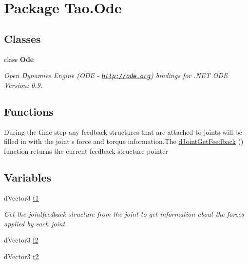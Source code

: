 \hypertarget{namespace_tao_1_1_ode}{
\section{Package Tao.Ode}
\label{namespace_tao_1_1_ode}
}
\subsection*{Classes}
\begin{DoxyCompactItemize}
\item 
class {\bfseries Ode}
\begin{DoxyCompactList}\small\item\em Open Dynamics Engine (ODE -\/ \href{http://ode.org}{\tt http://ode.org}) bindings for .NET ODE Version: 0.9. \item\end{DoxyCompactList}\end{DoxyCompactItemize}
\subsection*{Functions}
\begin{DoxyCompactItemize}
\item 
During the time step any feedback structures that are attached to joints will be filled in with the joint s force and torque information.The \hyperlink{namespace_tao_1_1_ode_acb665b0ad53713bdc6095725a790aa80}{dJointGetFeedback} () function returns the current feedback structure pointer
\end{DoxyCompactItemize}
\subsection*{Variables}
\begin{DoxyCompactItemize}
\item 
dVector3 \hyperlink{namespace_tao_1_1_ode_a18b074b8eb179ae30ccd8800c92c8f2e}{t1}
\begin{DoxyCompactList}\small\item\em Get the jointfeedback structure from the joint to get information about the forces applied by each joint. \item\end{DoxyCompactList}\item 
dVector3 \hyperlink{namespace_tao_1_1_ode_ac86f748879f29523f490ddabfaf964e6}{f2}
\item 
dVector3 \hyperlink{namespace_tao_1_1_ode_a26d9983cf37b06be0dc8f8034f9c1cb8}{t2}
\end{DoxyCompactItemize}



